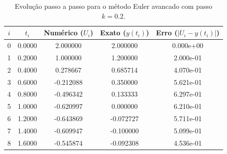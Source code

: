 \begin{table}[H]
    \centering
    \begin{tabular}{ccccc}
        \hline
        $i$ & $t_i$ & Numérico ($U_i$) & Exato ($y(t_i)$) & Erro ($|U_i - y(t_i)|$) \\
        \hline
        0 & 0.0000 & 2.000000 & 2.000000 & 0.000e+00 \\
        1 & 0.2000 & 1.000000 & 1.200000 & 2.000e-01 \\
        2 & 0.4000 & 0.278667 & 0.685714 & 4.070e-01 \\
        3 & 0.6000 & -0.212088 & 0.350000 & 5.621e-01 \\
        4 & 0.8000 & -0.496342 & 0.133333 & 6.297e-01 \\
        5 & 1.0000 & -0.620997 & 0.000000 & 6.210e-01 \\
        6 & 1.2000 & -0.643869 & -0.072727 & 5.711e-01 \\
        7 & 1.4000 & -0.609947 & -0.100000 & 5.099e-01 \\
        8 & 1.6000 & -0.545874 & -0.092308 & 4.536e-01 \\
        \hline
    \end{tabular}
    \caption{Evolução passo a passo para o método Euler avancado com passo $k=0.2$.}
    \label{tab:trajetoria_euler_avancado_k02}
\end{table}
